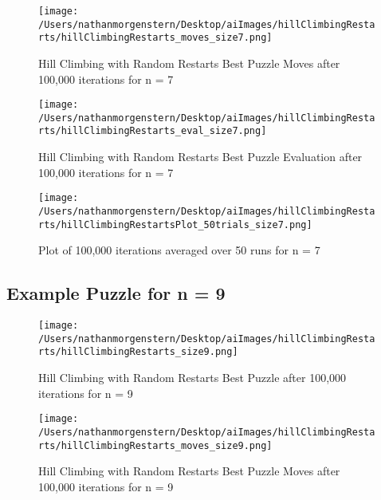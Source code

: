 \documentclass{report}
\begin{document}
	\begin{figure}[H]
	\centering
	\texttt{[image: /Users/nathanmorgenstern/Desktop/aiImages/hillClimbingRestarts/hillClimbingRestarts\_moves\_size7.png]}
	\caption{Hill Climbing with Random Restarts Best Puzzle Moves after 100,000 iterations for n = 7} 
	\label{fig: Hill Climbing with Random Restarts Best Puzzle Moves after 100,000 iterations for n = 7}
	\end{figure}

	\begin{figure}[H]
	\centering
	\texttt{[image: /Users/nathanmorgenstern/Desktop/aiImages/hillClimbingRestarts/hillClimbingRestarts\_eval\_size7.png]}
	\caption{Hill Climbing with Random Restarts Best Puzzle Evaluation after 100,000 iterations for n = 7} 
	\label{fig: Hill Climbing with Random Restarts Best Puzzle Evaluation after 100,000 iterations for n = 7}
	\end{figure}

	\begin{figure}[H]
	\centering
	\texttt{[image: /Users/nathanmorgenstern/Desktop/aiImages/hillClimbingRestarts/hillClimbingRestartsPlot\_50trials\_size7.png]}
	\caption{Plot of 100,000 iterations averaged over 50 runs for n = 7}
	\label{fig: Plot of 100,000 iterations averaged over 50 runs for n = 7}
	\end{figure}
	
\subsection{Example Puzzle for n = 9}
\begin{figure}[H]
	\centering
	\texttt{[image: /Users/nathanmorgenstern/Desktop/aiImages/hillClimbingRestarts/hillClimbingRestarts\_size9.png]}
	\caption{Hill Climbing with Random Restarts Best Puzzle after 100,000 iterations for n = 9} 
	\label{fig: Hill Climbing with Random Restarts Best Puzzle after 100,000 iterations for n = 9}
	\end{figure}
	
	\begin{figure}[H]
	\centering
	\texttt{[image: /Users/nathanmorgenstern/Desktop/aiImages/hillClimbingRestarts/hillClimbingRestarts\_moves\_size9.png]}
	\caption{Hill Climbing with Random Restarts Best Puzzle Moves after 100,000 iterations for n = 9} 
	\label{fig: Hill Climbing with Random Restarts Best Puzzle Moves after 100,000 iterations for n = 9}
	\end{figure}
\end{document}
